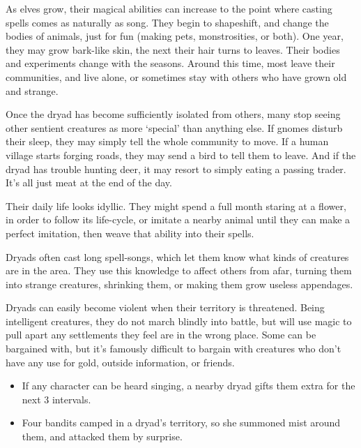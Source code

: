\begin{multicols}{2}

\noindent
As elves grow, their magical abilities can increase to the point where casting spells comes as naturally as song.
They begin to shapeshift, and change the bodies of animals, just for fun (making pets, monstrosities, or both).
One year, they may grow bark-like skin, the next their hair turns to leaves.
Their bodies and experiments change with the seasons.
Around this time, most leave their communities, and live alone, or sometimes stay with others who have grown old and strange.

Once the dryad has become sufficiently isolated from others, many stop seeing other sentient creatures as more `special' than anything else.
If gnomes disturb their sleep, they may simply tell the whole community to move.
If a human \gls{village} starts forging roads, they may send a bird to tell them to leave.
And if the dryad has trouble hunting deer, it may resort to simply eating a passing trader.
It's all just meat at the end of the day.

Their daily life looks idyllic.
They might spend a full month staring at a flower, in order to follow its life-cycle, or imitate a nearby animal until they can make a perfect imitation, then weave that ability into their spells.

Dryads often cast long spell-songs, which let them know what kinds of creatures are in the area.
They use this knowledge to affect others from afar, turning them into strange creatures, shrinking them, or making them grow useless appendages.

Dryads can easily become violent when their territory is threatened.
Being intelligent creatures, they do not march blindly into battle, but will use magic to pull apart any settlements they feel are in the wrong place.
Some can be bargained with, but it's famously difficult to bargain with creatures who don't have any use for gold, outside information, or friends.

\dryad

\showStdSpells

\showEnc[El]

\begin{itemize}

  \item
  If any character can be heard singing, a nearby dryad gifts them extra  for the next 3 \glspl{interval}.
  \item
  Four bandits camped in a dryad's territory, so she summoned mist around them, and attacked them by surprise.


\end{itemize}
\end{multicols}
